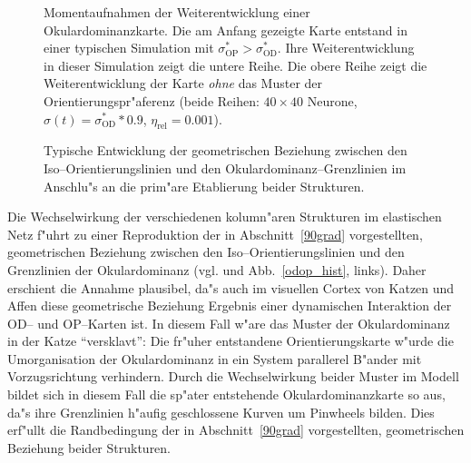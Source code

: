 \begin{figure}[p]
\begin{center}
\begin{sideways}
\end{sideways}
\end{center}
\caption{Momentaufnahmen der Weiterentwicklung einer Okulardominanzkarte.
Die am Anfang gezeigte Karte entstand in einer typischen Simulation mit
$\sigma^\ast_{\text{OP}}>\sigma^\ast_{\text{OD}}$. Ihre Weiterentwicklung in
dieser Simulation zeigt die untere Reihe. Die obere Reihe zeigt die
Weiterentwicklung der Karte \emph{ohne} das Muster der
Orientierungspr"aferenz (beide Reihen: $40\times 40$ Neurone,
$\sigma(t)=\sigma^\ast_{\text{OD}}*0.9$, $\eta_{\text{rel}}=0.001$).}
\label{oddev}
\end{figure}

\begin{figure}[p]
\begin{center}
\begin{sideways}
\end{sideways}
\end{center}
\caption{Typische Entwicklung der geometrischen Beziehung zwischen den
Iso--Orientierungslinien und den Okulardominanz--Grenzlinien im Anschlu"s
an die prim"are Etablierung beider Strukturen.}
\label{angledev}
\end{figure}

Die Wechselwirkung der verschiedenen kolumn"aren Strukturen im elastischen
Netz f"uhrt zu einer Reproduktion der in Abschnitt~\ref{90grad}
vorgestellten, geometrischen Beziehung zwischen den
Iso--Orientierungslinien und den Grenzlinien der Okulardominanz
(vgl.  und Abb.~\ref{odop_hist}, links). Daher
erschient die Annahme plausibel, da"s auch im visuellen Cortex von Katzen
und Affen diese geometrische Beziehung Ergebnis einer dynamischen
Interaktion der OD-- und OP--Karten ist. In diesem Fall w"are das Muster
der Okulardominanz in der Katze ``versklavt'': Die fr"uher entstandene
Orientierungskarte w"urde die Umorganisation der Okulardominanz in ein
System parallerel B"ander mit Vorzugsrichtung verhindern.  Durch die
Wechselwirkung beider Muster im Modell bildet sich in diesem Fall die
sp"ater entstehende Okulardominanzkarte so aus, da"s ihre Grenzlinien
h"aufig geschlossene Kurven um Pinwheels bilden. Dies erf"ullt die
Randbedingung der in Abschnitt~\ref{90grad} vorgestellten, geometrischen
Beziehung beider Strukturen. 

